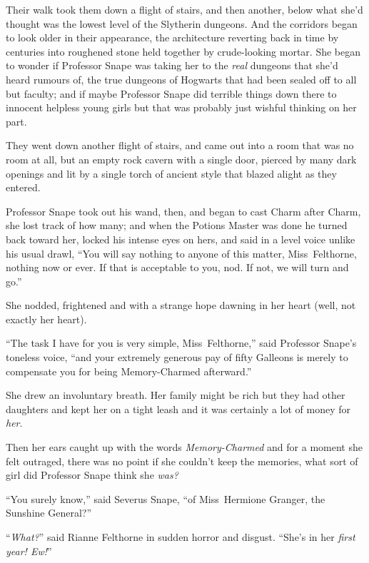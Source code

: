 Their walk took them down a flight of stairs, and then another, below what
she’d thought was the lowest level of the Slytherin dungeons. And the corridors
began to look older in their appearance, the architecture reverting back in
time by centuries into roughened stone held together by crude-looking mortar.
She began to wonder if Professor Snape was taking her to the \emph{real}
dungeons that she’d heard rumours of, the true dungeons of Hogwarts that had
been sealed off to all but faculty; and if maybe Professor Snape did terrible
things down there to innocent helpless young girls but that was probably just
wishful thinking on her part.

They went down another flight of stairs, and came out into a room that was no
room at all, but an empty rock cavern with a single door, pierced by many dark
openings and lit by a single torch of ancient style that blazed alight as they entered.

Professor Snape took out his wand, then, and began to cast Charm after Charm,
she lost track of how many; and when the Potions Master was done he turned back
toward her, locked his intense eyes on hers, and said in a level voice unlike
his usual drawl, “You will say nothing to anyone of this matter,
Miss~Felthorne, nothing now or ever. If that is acceptable to you, nod. If not, we
will turn and go.”

She nodded, frightened and with a strange hope dawning in her heart (well, not
exactly her heart).

“The task I have for you is very simple, Miss~Felthorne,” said Professor
Snape’s toneless voice, “and your extremely generous pay of fifty Galleons is
merely to compensate you for being Memory-Charmed afterward.”

She drew an involuntary breath. Her family might be rich but they had other
daughters and kept her on a tight leash and it was certainly a lot of money for
\emph{her}.

Then her ears caught up with the words \emph{Memory-Charmed} and for a moment
she felt outraged, there was no point if she couldn’t keep the memories, what
sort of girl did Professor Snape think she \emph{was?}

“You surely know,” said Severus Snape, “of Miss~Hermione Granger, the Sunshine
General?”

“\emph{What?}” said Rianne Felthorne in sudden horror and disgust. “She’s in
her \emph{first year! Ew!}”

